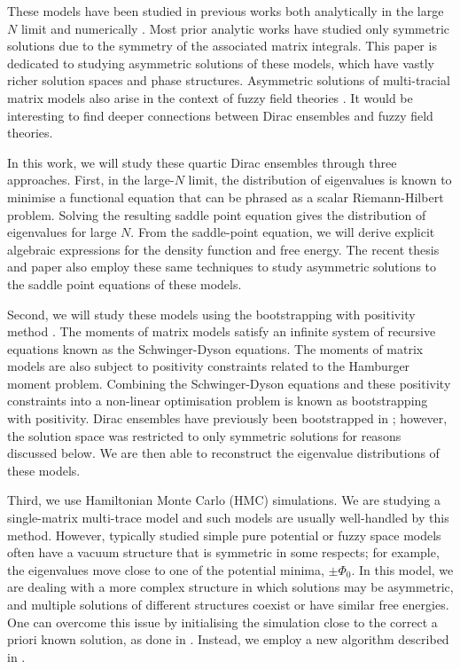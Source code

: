 \documentclass[10pt]{article}
\theoremstyle{plain}
\theoremstyle{definition}
\theoremstyle{plain}
\begin{document}
These models have been studied in previous works both analytically in the large $N$ limit \cite{khalkhali2020phase,khalkhali2022spectral,hessam2023double} and numerically \cite{barrett2016monte,d2022numerical,perez2021multimatrix,glaser2017scaling}. Most prior analytic works have studied only symmetric solutions due to the symmetry of the associated matrix integrals. This paper is dedicated to studying asymmetric solutions of these models, which have vastly richer solution spaces and phase structures. Asymmetric solutions of multi-tracial matrix models also arise in the context of fuzzy field theories \cite{tekel2015matrix,tekel2018asymmetric,Bukor:2024kqy,prekrat2023approximate}. It would be interesting to find deeper connections between Dirac ensembles and fuzzy field theories. 

In this work, we will study these quartic Dirac ensembles through three approaches. First, in the large-$N$ limit, the distribution of eigenvalues is known to minimise a functional equation that can be phrased as a scalar Riemann-Hilbert problem. Solving the resulting saddle point equation gives the distribution of eigenvalues for large $N$. From the saddle-point equation, we will derive explicit algebraic expressions for the density function and free energy. The recent thesis and paper \cite{d2022numerical,d2026symmetry} also employ these same techniques to study asymmetric solutions to the saddle point equations of these models.



Second, we will study these models using the bootstrapping with positivity method \cite{lin2020bootstraps,kazakov2022analytic,li2025analytic,khalkhali2025bootstrapping}. The moments of matrix models satisfy an infinite system of recursive equations known as the Schwinger-Dyson equations. The moments of matrix models are also subject to positivity constraints related to the Hamburger moment problem. Combining the Schwinger-Dyson equations and these positivity constraints into a non-linear optimisation problem is known as bootstrapping with positivity. Dirac ensembles have previously been bootstrapped in \cite{hessam2022bootstrapping}; however, the solution space was restricted to only symmetric solutions for reasons discussed below. We are then able to reconstruct the eigenvalue distributions of these models.


Third, we use Hamiltonian Monte Carlo (HMC) simulations. We are studying a single-matrix multi-trace model and such models are usually well-handled by this method. However, typically studied simple pure potential or fuzzy space models often have a vacuum structure that is symmetric in some respects; for example, the eigenvalues move close to one of the potential minima, $\pm \Phi_0$. In this model, we are dealing with a more complex structure in which solutions may be asymmetric, and multiple solutions of different structures coexist or have similar free energies. One can overcome this issue by initialising the simulation close to the correct a priori known solution, as done in \cite{d2026symmetry}. Instead, we employ a new algorithm described in \cite{Kovacik:2026ybz}.
\end{document}
